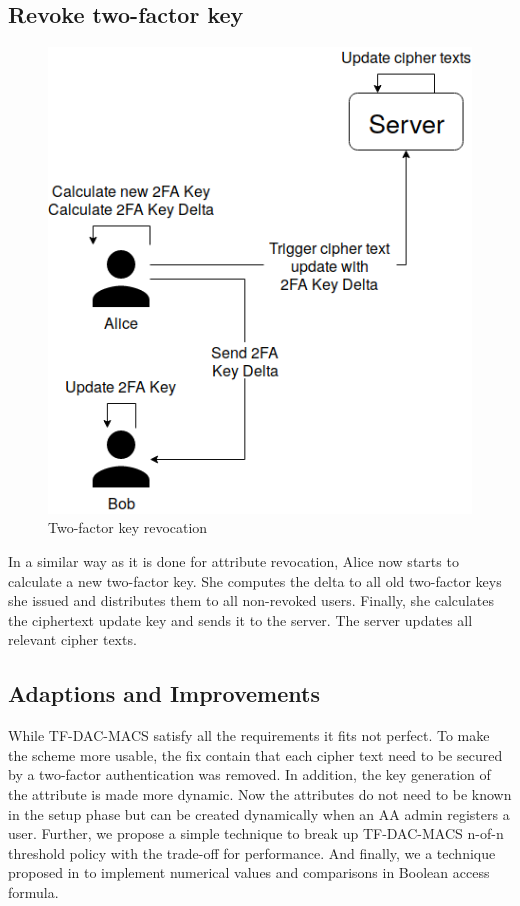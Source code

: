 \subsection{Revoke two-factor key}
\begin{figure}[!t]
\centering
    \includegraphics[width=0.6\linewidth]{img/TF-DAC-MACS-overview-revoce-user-key.png}
    \caption{Two-factor key revocation}
    \label{fig:tfdacmacs-user-auth-key-revocation}
\end{figure}

In a similar way as it is done for attribute revocation, Alice now starts to calculate a new two-factor key. She computes the delta to all old two-factor keys she issued and distributes them to all non-revoked users. Finally, she calculates the ciphertext update key and sends it to the server. The server updates all relevant cipher texts.

\subsection{Adaptions and Improvements}
While TF-DAC-MACS satisfy all the requirements it fits not perfect. To make the scheme more usable, the fix contain that each cipher text need to be secured by a two-factor authentication was removed. In addition, the key generation of the attribute is made more dynamic. Now the attributes do not need to be known in the setup phase but can be created dynamically when an AA admin registers a user. Further, we propose a simple technique to break up TF-DAC-MACS n-of-n threshold policy with the trade-off for performance. And finally, we a technique proposed in \cite{bethencourt2007ciphertext} to implement numerical values and comparisons in Boolean access formula. 

